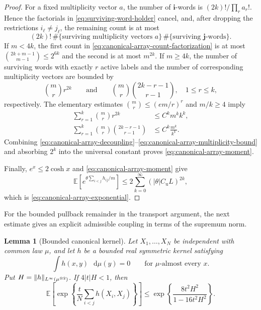 \documentclass[11pt,reqno]{amsart}
\numberwithin{equation}{section}
\theoremstyle{plain}
\newtheorem{lemma}[lemma]{Lemma}
\theoremstyle{definition}
\DeclarePairedDelimiter{\norm}{\lVert}{\rVert}
\newcommand{\dd}{\mathop{}\!\mathrm d}
\newcommand{\E}{\mathbb E}
\begin{document}
\begin{proof}
For a fixed multiplicity vector $a$, the number of $\mathbf i$-words is $(2k)!/\prod_r a_r!$.  Hence the factorials in \eqref{eq:surviving-word-holder} cancel, and, after dropping the restrictions $i_\ell\neq j_\ell$, the remaining count is at most
\begin{equation}
 (2k)!\,
 \#\{\text{surviving multiplicity vectors }a\}\,
 \#\{\text{surviving }\mathbf j\text{-words}\}.
 \label{eq:canonical-array-count-factorization}
\end{equation}
If $m<4k$, the first count in \eqref{eq:canonical-array-count-factorization} is at most $\binom{2k+m-1}{m-1}\leq2^{6k}$ and the second is at most $m^{2k}$.  If $m\geq4k$, the number of surviving words with exactly $r$ active labels and the number of corresponding multiplicity vectors are bounded by
\begin{equation}
 \binom mr r^{2k}
 \qquad\text{and}\qquad
 \binom mr\binom{2k-r-1}{r-1},
 \quad 1\leq r\leq k,
 \label{eq:canonical-array-two-counts}
\end{equation}
respectively.  The elementary estimates $\binom mr\leq(em/r)^r$ and $m/k\geq4$ imply
\begin{align}
 \sum_{r=1}^k\binom mr r^{2k}
 &\leq C^k m^k k^k,
 \label{eq:canonical-array-word-bound}\\
 \sum_{r=1}^k\binom mr\binom{2k-r-1}{r-1}
 &\leq C^k\frac{m^k}{k^k}.
 \label{eq:canonical-array-multiplicity-bound}
\end{align}
Combining \eqref{eq:canonical-array-decoupling}--\eqref{eq:canonical-array-multiplicity-bound} and absorbing $2^k$ into the universal constant proves \eqref{eq:canonical-array-moment}.

Finally, $e^x\leq2\cosh x$ and \eqref{eq:canonical-array-moment} give
\begin{equation}
 \E\left[e^{\theta\sum_{i<j}h_{ij}/m}\right]
 \leq2\sum_{k=0}^{\infty}
 (|\theta|C_{\mathrm u}L)^{2k},
 \label{eq:canonical-array-cosh-series}
\end{equation}
which is \eqref{eq:canonical-array-exponential}.
\end{proof}


For the bounded pullback remainder in the transport argument, the next estimate gives an explicit admissible coupling in terms of the supremum norm.


\begin{lemma}[Bounded canonical kernel]
\label{lem:bounded-canonical-kernel}
Let $X_1,\ldots,X_N$ be independent with common law $\mu$, and let $h$ be a bounded real symmetric kernel satisfying
\begin{equation}
 \int h(x,y)\,\dd\mu(y)=0
 \qquad\text{for }\mu\text{-almost every }x.
 \label{eq:bounded-kernel-canonicality}
\end{equation}
Put $H=\norm{h}_{L^\infty(\mu^{\otimes2})}$.  If $4|t|H<1$, then
\begin{equation}
 \E\left[\exp\left\{\frac tN\sum_{i<j}h(X_i,X_j)\right\}\right]
 \leq\exp\left\{\frac{8t^2H^2}{1-16t^2H^2}\right\}.
 \label{eq:bounded-canonical-exponential}
\end{equation}
\end{lemma}
\end{document}
